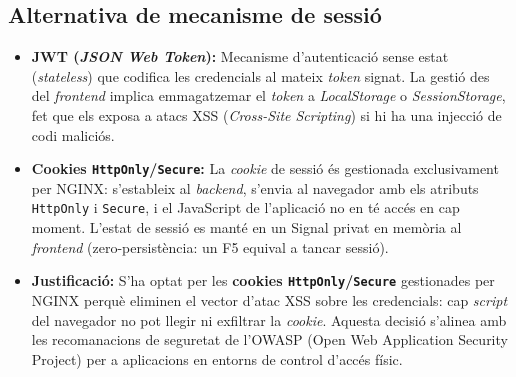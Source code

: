 \subsection{Alternativa de mecanisme de sessió}
\begin{itemize}
  \item \textbf{JWT (\textit{JSON Web Token}):} Mecanisme d'autenticació sense estat (\textit{stateless}) \cite{rfc7519} que codifica les credencials al mateix \textit{token} signat. La gestió des del \textit{frontend} implica emmagatzemar el \textit{token} a \textit{LocalStorage} o \textit{SessionStorage}, fet que els exposa a atacs XSS (\textit{Cross-Site Scripting}) si hi ha una injecció de codi maliciós.
  \item \textbf{Cookies \texttt{HttpOnly}/\texttt{Secure}:} La \textit{cookie} de sessió és gestionada exclusivament per NGINX: s'estableix al \textit{backend}, s'envia al navegador amb els atributs \texttt{HttpOnly} i \texttt{Secure}, i el JavaScript de l'aplicació no en té accés en cap moment. L'estat de sessió es manté en un Signal privat en memòria al \textit{frontend} (zero-persistència: un F5 equival a tancar sessió).
  \item \textbf{Justificació:} S'ha optat per les \textbf{cookies \texttt{HttpOnly}/\texttt{Secure}} gestionades per NGINX perquè eliminen el vector d'atac XSS sobre les credencials: cap \textit{script} del navegador no pot llegir ni exfiltrar la \textit{cookie}. Aquesta decisió s'alinea amb les recomanacions de seguretat de l'OWASP (Open Web Application Security Project) per a aplicacions en entorns de control d'accés físic.
\end{itemize}

